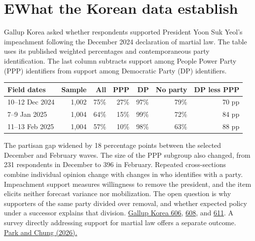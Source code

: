 \documentclass[11pt,letterpaper]{article}
\newcommand{\sect}[1]{\section*{\color{ink}#1}}
\newcommand{\src}[2]{\href{#1}{#2}}
\begin{document}
\newpage
\sect{E\quad What the Korean data establish}
Gallup Korea asked whether respondents supported President Yoon Suk Yeol's impeachment following the December 2024 declaration of martial law. The table uses its published weighted percentages and contemporaneous party identification. The last column subtracts support among People Power Party (PPP) identifiers from support among Democratic Party (DP) identifiers.
\begin{center}\small
\begin{tabular}{@{}lrrrrrr@{}}\toprule
Field dates & Sample & All & PPP & DP & No party & DP less PPP\\\midrule
10--12 Dec 2024 & 1,002 & 75\% & 27\% & 97\% & 79\% & 70 pp\\
7--9 Jan 2025   & 1,004 & 64\% & 15\% & 99\% & 72\% & 84 pp\\
11--13 Feb 2025 & 1,004 & 57\% & 10\% & 98\% & 63\% & 88 pp\\\bottomrule
\end{tabular}\end{center}
The partisan gap widened by 18 percentage points between the selected December and February waves. The size of the PPP subgroup also changed, from 231 respondents in December to 396 in February. Repeated cross-sections combine individual opinion change with changes in who identifies with a party. Impeachment support measures willingness to remove the president, and the item elicits neither forecast variance nor mobilization. The open question is why supporters of the same party divided over removal, and whether expected policy under a successor explains that division. \src{https://www.gallup.co.kr/dir/GallupKoreaDaily/GallupKoreaDailyOpinion_606(20241213).pdf}{Gallup Korea 606}, \src{https://www.gallup.co.kr/dir/GallupKoreaDaily/GallupKoreaDailyOpinion_608(20250110).pdf}{608}, and \src{https://www.gallup.co.kr/dir/GallupKoreaDaily/GallupKoreaDailyOpinion_611(20250214).pdf}{611}. A survey directly addressing support for martial law offers a separate outcome. \src{https://doi.org/10.1177/00323217261462390}{Park and Chung (2026).}
\end{document}
